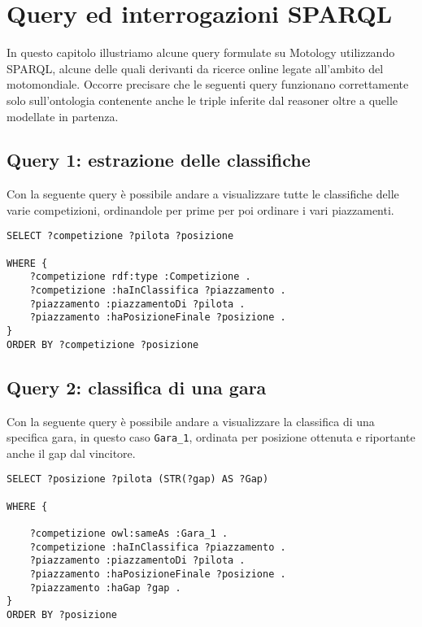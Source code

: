 \chapter{Query ed interrogazioni SPARQL}

In questo capitolo illustriamo alcune query formulate su Motology utilizzando SPARQL, alcune delle quali derivanti da ricerce online legate all'ambito del motomondiale. Occorre precisare che le seguenti query funzionano correttamente solo sull'ontologia contenente anche le triple inferite dal reasoner oltre a quelle modellate in partenza.

\section{Query 1: estrazione delle classifiche}

Con la seguente query è possibile andare a visualizzare tutte le classifiche delle varie competizioni, ordinandole per prime per poi ordinare i vari piazzamenti. \\

\begin{lstlisting}[captionpos=b, caption=Estrazione delle classifiche, label=lst:sparql1,
   basicstyle=\ttfamily,frame=single]
SELECT ?competizione ?pilota ?posizione

WHERE {
	?competizione rdf:type :Competizione .
	?competizione :haInClassifica ?piazzamento .
	?piazzamento :piazzamentoDi ?pilota .
	?piazzamento :haPosizioneFinale ?posizione .
}
ORDER BY ?competizione ?posizione
\end{lstlisting}

\section{Query 2: classifica di una gara}

Con la seguente query è possibile andare a visualizzare la classifica di una specifica gara, in questo caso \texttt{Gara\_1}, ordinata per posizione ottenuta e riportante anche il gap dal vincitore. \\

\begin{lstlisting}[captionpos=b, caption=Classifica di una gara, label=lst:sparql2, basicstyle=\ttfamily,frame=single]
SELECT ?posizione ?pilota (STR(?gap) AS ?Gap) 

WHERE {
	
	?competizione owl:sameAs :Gara_1 .
	?competizione :haInClassifica ?piazzamento .
	?piazzamento :piazzamentoDi ?pilota .
	?piazzamento :haPosizioneFinale ?posizione .
	?piazzamento :haGap ?gap .
}
ORDER BY ?posizione
\end{lstlisting}

